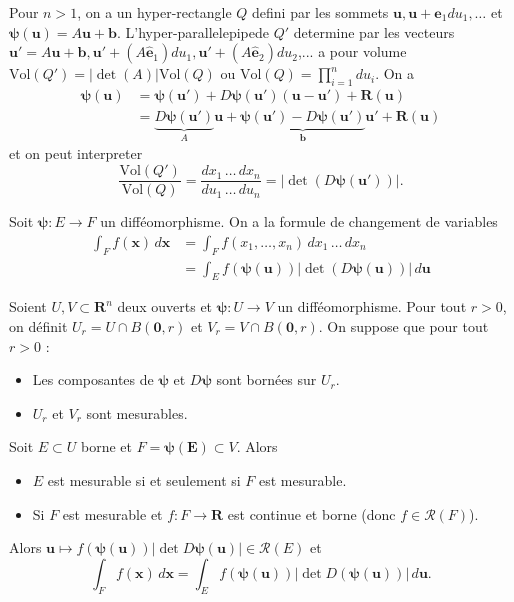 Pour $n>1$, on a un hyper-rectangle $Q$ defini par les sommets $\boldsymbol{u}, \boldsymbol{u}+\boldsymbol{\hat{e}}_{1}du_{1},\dots$ et $\boldsymbol{\psi}(\boldsymbol{u})=A\boldsymbol{u}+\boldsymbol{b}$. L'hyper-parallelepipede $Q'$ determine par les vecteurs $\boldsymbol{u}'=A\boldsymbol{u}+\boldsymbol{b},\boldsymbol{u'}+(A\boldsymbol{\hat{e}}_{1})du_{1},\boldsymbol{u}'+(A\boldsymbol{\hat{e}}_{2})du_{2}$,... a pour volume $\mathrm{Vol}(Q')=|\det(A)|\mathrm{Vol}(Q)$ ou $\mathrm{Vol}(Q)=\prod_{i=1}^{n}du_{i}$. On a
\begin{align*}
\boldsymbol{\psi}(\boldsymbol{u}) & =\boldsymbol{\psi}(\boldsymbol{u}')+D\boldsymbol{\psi}(\boldsymbol{u}')(\boldsymbol{u}-\boldsymbol{u}')+\boldsymbol{R}(\boldsymbol{u}) \\
 & =\underbrace{ D\boldsymbol{\psi}(\boldsymbol{u}') }_{ A }\boldsymbol{u}+\underbrace{ \boldsymbol{\psi}(\boldsymbol{u}')-D\boldsymbol{\psi}(\boldsymbol{u}') }_{ \boldsymbol{b} }\boldsymbol{u}' +\boldsymbol{R}(\boldsymbol{u})
\end{align*}
et on peut interpreter
$$
\frac{\mathrm{Vol}(Q')}{\mathrm{Vol}(Q)}=\frac{dx_{1}\,\dots\,dx_{n}}{du_{1}\,\dots\,du_{n}}=|\det(D\boldsymbol{\psi}(\boldsymbol{u}'))|.
$$

Soit $\boldsymbol{\psi}:E\to F$ un difféomorphisme. On a la formule de changement de variables
\begin{align*}
\int _{F}f(\boldsymbol{x}) \, d\boldsymbol{x}  & =\int _{F}f(x_{1},\dots,x_{n} ) \, dx_{1}\,\dots\,dx_{n} \\
 & =\int _{E}f(\boldsymbol{\psi}(\boldsymbol{u}))|\det(D\boldsymbol{\psi}(\boldsymbol{u}))| \, d\boldsymbol{u}  
\end{align*}

\begin{theorem}
Soient $U,V\subset \mathbf{R}^{n}$ deux ouverts et $\boldsymbol{\psi}:U\to V$ un difféomorphisme. Pour tout $r>0$, on définit $U_{r}=U\cap B(\boldsymbol{0},r)$ et $V_{r}=V\cap B(\boldsymbol{0},r)$. On suppose que pour tout $r>0$ :
\begin{itemize}
\item Les composantes de $\boldsymbol{\psi}$ et $D\boldsymbol{\psi}$ sont bornées sur $U_{r}$.
\item $U_{r}$ et $V_{r}$ sont mesurables.
\end{itemize}
Soit $E\subset U$ borne et $F=\boldsymbol{\psi}(\boldsymbol{E})\subset V$. Alors
\begin{itemize}
\item $E$ est mesurable si et seulement si $F$ est mesurable.
\item Si $F$ est mesurable et $f:F\to \mathbf{R}$ est continue et borne (donc $f\in \mathcal{R}(F)$).
\end{itemize}
Alors $\boldsymbol{u}\mapsto f(\boldsymbol{\psi}(\boldsymbol{u}))|\det D\boldsymbol{\psi}(\boldsymbol{u})|\in \mathcal{R}(E)$ et 
$$
\int _{F}f(\boldsymbol{x}) \, d\boldsymbol{x}=\int _{E}f(\boldsymbol{\psi}(\boldsymbol{u}))|\det D(\boldsymbol{\psi}(\boldsymbol{u}))| \, d\boldsymbol{u}.  
$$

\end{theorem}
